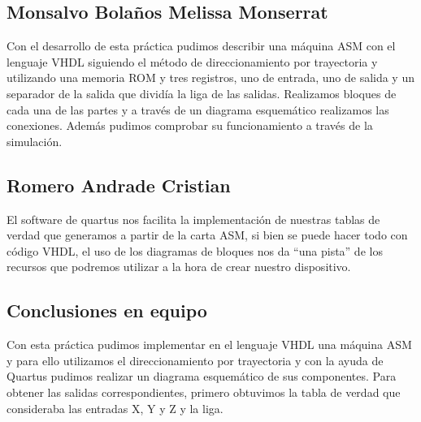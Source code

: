 \documentclass[table]{scrartcl}
\begin{document}
\subsection*{Monsalvo Bolaños Melissa Monserrat}\label{sec:mons-bolan-melissa}



Con el desarrollo de esta práctica pudimos describir una máquina ASM con el
lenguaje VHDL siguiendo el método de direccionamiento por trayectoria y
utilizando una memoria ROM y tres registros, uno de entrada, uno de salida y un
separador de la salida que dividía la liga de las salidas. Realizamos bloques de
cada una de las partes y a través de un diagrama esquemático realizamos las
conexiones. Además pudimos comprobar su funcionamiento a través de la
simulación.

\subsection*{Romero Andrade Cristian}
\label{sec:romero-andr-crist}



El software de quartus nos facilita la
implementación de nuestras tablas de verdad que generamos a partir de la carta
ASM, si bien se puede hacer todo con código VHDL, el uso de los diagramas de
bloques nos da “una pista” de los recursos que podremos utilizar a la hora de
crear nuestro dispositivo.

\subsection*{Conclusiones en equipo}
\label{sec:concl-en-equipo}



Con esta práctica pudimos implementar en el
lenguaje VHDL una máquina ASM y para ello utilizamos el direccionamiento por
trayectoria y con la ayuda de Quartus pudimos realizar un diagrama
esquemático de sus componentes. Para obtener las salidas correspondientes,
primero obtuvimos la tabla de verdad que consideraba las entradas X, Y y Z y la
liga.

\nocite{*}
\printbibliography{}
\end{document}
